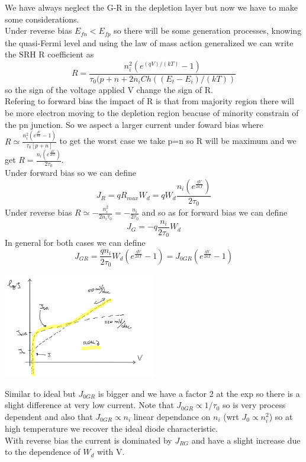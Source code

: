 We have always neglect the G-R in the depletion layer but now we have to make some considerations.\\
Under reverse bias $E_{fn}<E_{fp}$ so there will be some generation processes, knowing the quasi-Fermi level and using the law of mass action generalized we can write the SRH R coefficient as
\begin{equation}
R=\frac{n_i^2(e^{(qV)/(kT)}-1)}{\tau_0(p+n+2n_i Ch((E_t-E_i)/(kT))}
\end{equation} 
so the sign of the voltage applied V change the sign of R.\\
Refering to forward bias the impact of R is that from majority region there will be more electron moving to the depletion region beacuse of minority constrain of the pn junction. 
So we aspect a larger current under foward bias where $R\simeq \frac{n_i^2(e^{\frac{qV}{kT}}-1)}{\tau_0[p+n]}$ to get the worst case we take p=n so R will be maximum and we get $R= \frac{n_i(e^{\frac{qV}{2kT}})}{2\tau_0}$.\\
Under forward bias so we can define 
\begin{equation}
J_R=qR_{max}W_d=qW_d\frac{n_i(e^{\frac{qV}{2kT}})}{2\tau_0}
\end{equation}
Under reverse bias $R\simeq -\frac{n_i^2}{2n_i\tau_0}=-\frac{n_i}{2\tau_0}$ and so as for forward bias we can define
\begin{equation}
J_G=-q\frac{n_i}{2\tau_0}W_d
\end{equation}
In general for both cases we can define 
\begin{equation}
J_{GR}=\frac{qn_i}{2\tau_0}W_d(e^{\frac{qV}{2kT}}-1)=J_{0GR}(e^{\frac{qV}{2kT}}-1)
\end{equation}

\centering
\includegraphics[width=0.5\textwidth]{lowcurrent.png}\\
\raggedright

Similar to ideal but $J_{0GR}$ is bigger and we have a factor 2 at the exp so there is a slight difference at very low current.
Note that $J_{0GR}\propto 1/\tau_0$ so is very process dependent and also that $J_{0GR}\propto n_i$ linear dependance on $n_i$ (wrt $J_0\propto n_i^2$) so at high temperature we recover the ideal diode characteristic.\\ 
With reverse bias the current is dominated by $J_{RG}$ and have a slight increase due to the dependence of $W_d$ with V.\\

